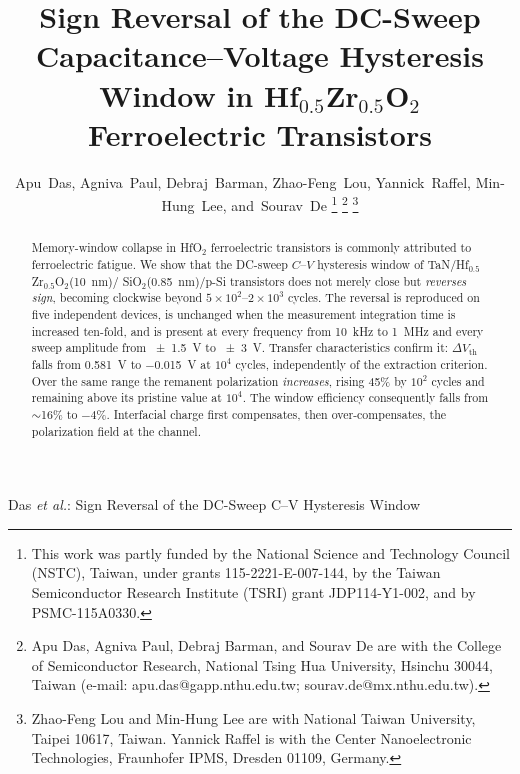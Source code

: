 \documentclass[journal]{IEEEtran}
\newcommand{\rev}[1]{{\color{blue}#1}}      %
\newcommand{\hzo}{Hf$_{0.5}$Zr$_{0.5}$O$_2$}
\newcommand{\Vth}{V_{\mathrm{th}}}
\begin{document}
\title{\rev{Sign Reversal of the DC-Sweep Capacitance--Voltage Hysteresis
Window in \hzo{} Ferroelectric Transistors}}

\author{Apu~Das, Agniva~Paul, Debraj~Barman, Zhao-Feng~Lou,
        Yannick~Raffel, Min-Hung~Lee, and~Sourav~De
\thanks{This work was partly funded by the National Science and Technology
Council (NSTC), Taiwan, under grants 115-2221-E-007-144, by the Taiwan
Semiconductor Research Institute (TSRI) grant JDP114-Y1-002, and by
PSMC-115A0330.}
\thanks{Apu Das, Agniva Paul, Debraj Barman, and Sourav De are with the
College of Semiconductor Research, National Tsing Hua University, Hsinchu
30044, Taiwan (e-mail: apu.das@gapp.nthu.edu.tw; sourav.de@mx.nthu.edu.tw).}
\thanks{Zhao-Feng Lou and Min-Hung Lee are with National Taiwan University,
Taipei 10617, Taiwan. Yannick Raffel is with the Center Nanoelectronic
Technologies, Fraunhofer IPMS, Dresden 01109, Germany.}}

%
{Das \MakeLowercase{\textit{et al.}}: Sign Reversal of the DC-Sweep C--V Hysteresis Window}
\maketitle

\begin{abstract}
\rev{Memory-window collapse in HfO$_2$ ferroelectric transistors is
commonly attributed to ferroelectric fatigue. We show that the DC-sweep
$C$--$V$ hysteresis window of TaN/\hzo{}(\SI{10}{\nano\meter})/
SiO$_2$(\SI{0.85}{\nano\meter})/p-Si transistors does not merely close
but \emph{reverses sign}, becoming clockwise beyond
$5\times10^2$--$2\times10^3$ cycles. The reversal is reproduced on five
independent devices, is unchanged when the measurement integration time
is increased ten-fold, and is present at every frequency from
\SI{10}{\kilo\hertz} to \SI{1}{\mega\hertz} and every sweep amplitude
from \SI{\pm1.5}{\volt} to \SI{\pm3}{\volt}. Transfer characteristics
confirm it: $\Delta\Vth$ falls from \SI{+0.581}{\volt} to
\SI{-0.015}{\volt} at $10^4$ cycles, independently of the extraction
criterion. Over the same range the remanent polarization
\emph{increases}, rising 45\% by $10^2$ cycles and remaining above its
pristine value at $10^4$. The window efficiency consequently falls from
$\sim$16\% to $-4$\%. Interfacial charge first compensates, then
over-compensates, the polarization field at the channel.}
\end{abstract}
\end{document}
